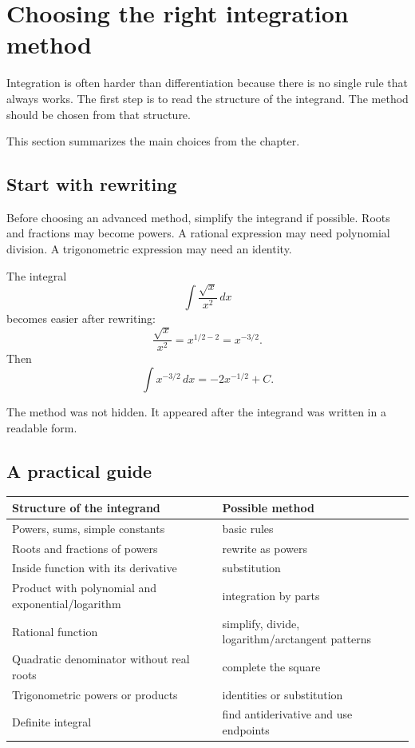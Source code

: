 \section{Choosing the right integration method}

Integration is often harder than differentiation because there is no single rule that always works. The first step is to read the structure of the integrand. The method should be chosen from that structure.

This section summarizes the main choices from the chapter.

\subsection*{Start with rewriting}

Before choosing an advanced method, simplify the integrand if possible. Roots and fractions may become powers. A rational expression may need polynomial division. A trigonometric expression may need an identity.

\begin{examplebox}
The integral
\[
\int \frac{\sqrt{x}}{x^2}\,dx
\]
becomes easier after rewriting:
\[
\frac{\sqrt{x}}{x^2}=x^{1/2-2}=x^{-3/2}.
\]
Then
\[
\int x^{-3/2}\,dx=-2x^{-1/2}+C.
\]
\end{examplebox}

The method was not hidden. It appeared after the integrand was written in a readable form.

\subsection*{A practical guide}

\begin{center}
\begin{tabular}{ll}
\toprule
Structure of the integrand & Possible method \\
\midrule
Powers, sums, simple constants & basic rules \\
Roots and fractions of powers & rewrite as powers \\
Inside function with its derivative & substitution \\
Product with polynomial and exponential/logarithm & integration by parts \\
Rational function & simplify, divide, logarithm/arctangent patterns \\
Quadratic denominator without real roots & complete the square \\
Trigonometric powers or products & identities or substitution \\
Definite integral & find antiderivative and use endpoints \\
\bottomrule
\end{tabular}
\end{center}

